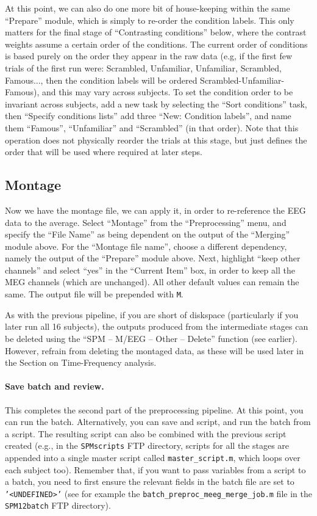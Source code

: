 At this point, we can also do one more bit of house-keeping within the same ``Prepare'' module, which is simply to re-order the condition labels. This only matters for the final stage of ``Contrasting conditions'' below, where the contrast weights assume a certain order of the conditions. The current order of conditions is based purely on the order they appear in the raw data (e.g, if the first few trials of the first run were: Scrambled, Unfamiliar, Unfamiliar, Scrambled, Famous..., then the condition labels will be ordered Scrambled-Unfamiliar-Famous), and this may vary across subjects. To set the condition order to be invariant across subjects, add a new task by selecting the ``Sort conditions'' task, then ``Specify conditions lists'' add three ``New: Condition labels'', and name them ``Famous'', ``Unfamiliar'' and ``Scrambled'' (in that order). Note that this operation does not physically reorder the trials at this stage, but just defines the order that will be used where required at later steps.

\subsection{Montage}

Now we have the montage file, we can apply it, in order to re-reference the EEG data to the average. Select ``Montage'' from the ``Preprocessing'' menu, and specify the ``File Name'' as being dependent on the output of the ``Merging'' module above. For the ``Montage file name'', choose a different dependency, namely the output of the ``Prepare'' module above. Next, highlight ``keep other channels'' and select ``yes'' in the ``Current Item'' box, in order to keep all the MEG channels (which are unchanged). All other default values can remain the same. The output file will be prepended with \texttt{M}.

As with the previous pipeline, if you are short of diskspace (particularly if you later run all 16 subjects), the outputs produced from the intermediate stages can be deleted using the ``SPM -- M/EEG -- Other -- Delete'' function (see earlier). However, refrain from deleting the montaged data, as these will be used later in the Section on Time-Frequency analysis.

\paragraph{Save batch and review.}

This completes the second part of the preprocessing pipeline. At this point, you can run the batch. Alternatively, you can save and script, and run the batch from a script. The resulting script can also be combined with the previous script created (e.g., in the \texttt{SPMscripts} FTP directory, scripts for all the stages are appended into a single master script called \texttt{master\_script.m}, which loops over each subject too). Remember that, if you want to pass variables from a script to a batch, you need to first ensure the relevant fields in the batch file are set to \texttt{'<UNDEFINED>'} (see for example the \texttt{batch\_preproc\_meeg\_merge\_job.m} file in the \texttt{SPM12batch} FTP directory).
 
